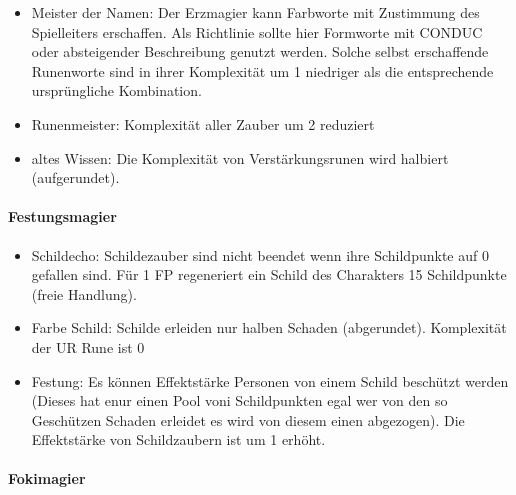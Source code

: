 \documentclass{article}
\begin{document}
\begin{itemize}
\item Meister der Namen: Der Erzmagier kann Farbworte mit Zustimmung des Spielleiters erschaffen. Als Richtlinie sollte hier Formworte mit CONDUC oder absteigender Beschreibung genutzt werden. Solche selbst erschaffende Runenworte sind in ihrer Komplexität um 1 niedriger als die entsprechende ursprüngliche Kombination.
\item Runenmeister: Komplexität aller Zauber um 2 reduziert
\item altes Wissen: Die Komplexität von Verstärkungsrunen wird halbiert (aufgerundet).
\end{itemize}

\paragraph{Festungsmagier}

\begin{itemize}
\item Schildecho: Schildezauber sind nicht beendet wenn ihre Schildpunkte auf 0 gefallen sind. Für 1 FP regeneriert ein Schild des Charakters 15 Schildpunkte (freie Handlung).
\item Farbe Schild: Schilde erleiden nur halben Schaden (abgerundet). Komplexität der UR Rune ist 0
\item Festung: Es können Effektstärke Personen von einem Schild beschützt werden (Dieses hat enur einen Pool voni Schildpunkten egal wer von den so Geschützen Schaden erleidet es wird von diesem einen abgezogen). Die Effektstärke von Schildzaubern ist um 1 erhöht.
\end{itemize}

\paragraph{Fokimagier}
\end{document}
